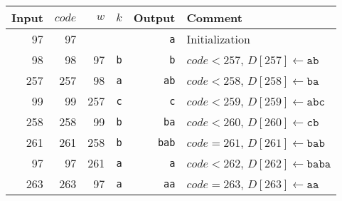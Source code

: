     \begin{tabular}{rrrrrl}
      Input & $code$ &    $w$ &     $k$ &  Output & Comment \\
      \hline
      97 &         97 &         &         & {\tt a} & Initialization\\
      98 &         98 &      97 & {\tt b} & {\tt b} & $code<257$, $D[257]\leftarrow\mathtt{ab}$\\
      257 &        257 &      98 & {\tt a} &{\tt ab} & $code<258$, $D[258]\leftarrow\mathtt{ba}$\\
      99 &         99 &     257 & {\tt c} & {\tt c} & $code<259$, $D[259]\leftarrow\mathtt{abc}$\\
      258 &        258 &      99 & {\tt b} &{\tt ba} & $code<260$, $D[260]\leftarrow\mathtt{cb}$\\
      261 &        261 &     258 & {\tt b} &{\tt bab}& $code=261$, $D[261]\leftarrow\mathtt{bab}$\\
      97 &         97 &     261 & {\tt a} & {\tt a} & $code<262$, $D[262]\leftarrow\mathtt{baba}$\\
      263 &        263 &      97 & {\tt a} &{\tt aa} & $code=263$, $D[263]\leftarrow\mathtt{aa}$
    \end{tabular}
